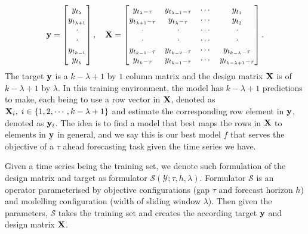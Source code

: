 \begin{equation*}
    \mathbf{y} = \begin{bmatrix}
        y_{t_\lambda}       \\
        y_{t_{\lambda + 1}} \\
        \cdot               \\
        \cdot               \\
        y_{t_{k-1}}         \\
        y_{t_k}             \\
    \end{bmatrix}
    , \quad
    \mathbf{X} = \begin{bmatrix}
        y_{t_{\lambda} - \tau}   & y_{t_{\lambda-1} - \tau} & \cdots & y_{t_{1}} \\
        y_{t_{\lambda+1} - \tau} & y_{t_{\lambda} - \tau}   & \cdots & y_{t_{2}} \\
        \cdot                    & \cdot                    & \cdots & \cdot     \\
        \cdot                    & \cdot                    & \cdots & \cdot     \\
        y_{t_{k-1} - \tau}       & y_{t_{k-2} - \tau}       & \cdots & y_{t_{k - \lambda} - \tau}     \\
        y_{t_{k} - \tau}         & y_{t_{k-1} - \tau}       & \cdots & y_{t_{k - \lambda + 1} - \tau} \\
    \end{bmatrix}.
\end{equation*}
The target $\mathbf{y}$ is a $k-\lambda+1$ by $1$ column matrix and the design matrix $\mathbf{X}$ is of $k-\lambda+1$ by $\lambda$. In this training environment, the model has $k-\lambda + 1$ predictions to make, each being to use a row vector in $\mathbf{X}$, denoted as $\mathbf{X}_i, \; i \in \{1, 2, \cdots, k-\lambda+1 \}$ and estimate the corresponding row element in $\mathbf{y}$, denoted as $\mathbf{y}_i$. The idea is to find a model that best maps the rows in $\mathbf{X}$ to elements in $\mathbf{y}$ in general, and we say this is our best model $f$ that serves the objective of a $\tau$ ahead forecasting task given the time series we have.

Given a time series being the training set, we denote such formulation of the design matrix and target as formulator $\mathcal{S}(\mathcal{Y};\tau, h, \lambda)$. Formulator $\mathcal{S}$ is an operator parameterised by objective configurations (gap $\tau$ and forecast horizon $h$) and modelling configuration (width of sliding window $\lambda$). Then given the parameters, $\mathcal{S}$ takes the training set and creates the according target $\mathbf{y}$ and design matrix $\mathbf{X}$.


